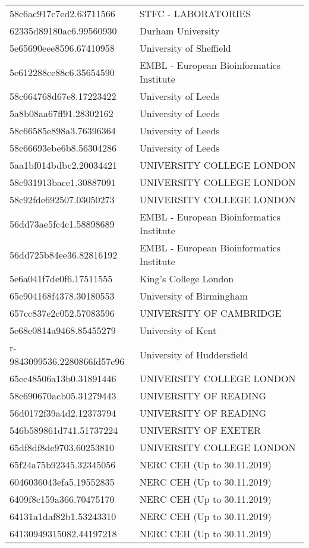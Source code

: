 \begin{tabular}{ll}
58c6ac917c7ed2.63711566 & STFC - LABORATORIES \\
62335d89180ac6.99560930 & Durham University \\
5e65690eee8596.67410958 & University of Sheffield \\
5e612288ce88c6.35654590 & EMBL - European Bioinformatics Institute \\
58c664768d67e8.17223422 & University of Leeds \\
5a8b08aa67ff91.28302162 & University of Leeds \\
58c66585e898a3.76396364 & University of Leeds \\
58c66693ebe6b8.56304286 & University of Leeds \\
5aa1bf014bdbc2.20034421 & UNIVERSITY COLLEGE LONDON \\
58c931913bace1.30887091 & UNIVERSITY COLLEGE LONDON \\
58c92fde692507.03050273 & UNIVERSITY COLLEGE LONDON \\
56dd73ae5fc4c1.58898689 & EMBL - European Bioinformatics Institute \\
56dd725b84ee36.82816192 & EMBL - European Bioinformatics Institute \\
5e6a041f7de0f6.17511555 & King's College London \\
65c904168f4378.30180553 & University of Birmingham \\
657cc837e2c052.57083596 & UNIVERSITY OF CAMBRIDGE \\
5e68e0814a9468.85455279 & University of Kent \\
r-9843099536.2280866fd57c96 & University of Huddersfield \\
65ec48506a13b0.31891446 & UNIVERSITY COLLEGE LONDON \\
58c690670acb05.31279443 & UNIVERSITY OF READING \\
56d0172f39a4d2.12373794 & UNIVERSITY OF READING \\
546b589861d741.51737224 & UNIVERSITY OF EXETER \\
65df8df8de9703.60253810 & UNIVERSITY COLLEGE LONDON \\
65f24a75b92345.32345056 & NERC CEH (Up to 30.11.2019) \\
6046036043efa5.19552835 & NERC CEH (Up to 30.11.2019) \\
6409f8c159a366.70475170 & NERC CEH (Up to 30.11.2019) \\
64131a1daf82b1.53243310 & NERC CEH (Up to 30.11.2019) \\
64130949315082.44197218 & NERC CEH (Up to 30.11.2019) \\

\end{tabular}
